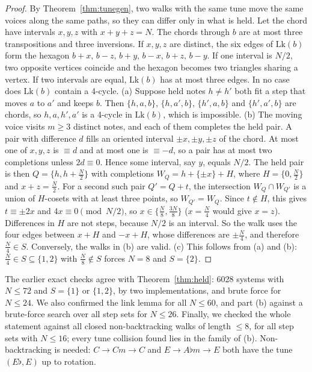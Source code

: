 \documentclass[11pt]{amsart}
\numberwithin{equation}{section}
\theoremstyle{plain}
\theoremstyle{definition}\newtheorem{definition}[theorem]{Definition}
\theoremstyle{remark}\newtheorem{remark}[theorem]{Remark}
\begin{document}
\begin{proof}
By Theorem~\ref{thm:tunegen}, two walks with the same tune move the same voices along the same paths, so they can differ only in what is held. Let the chord have intervals $x,y,z$ with $x+y+z=N$. The chords through $b$ are at most three transpositions and three inversions. If $x,y,z$ are distinct, the six edges of $\mathrm{Lk}(b)$ form the hexagon $b{+}x,\,b{-}z,\,b{+}y,\,b{-}x,\,b{+}z,\,b{-}y$. If one interval is $N/2$, two opposite vertices coincide and the hexagon becomes two triangles sharing a vertex. If two intervals are equal, $\mathrm{Lk}(b)$ has at most three edges. In no case does $\mathrm{Lk}(b)$ contain a 4-cycle.
(a) Suppose held notes $h\ne h'$ both fit a step that moves $a$ to $a'$ and keeps $b$. Then $\{h,a,b\}$, $\{h,a',b\}$, $\{h',a,b\}$ and $\{h',a',b\}$ are chords, so $h,a,h',a'$ is a 4-cycle in $\mathrm{Lk}(b)$, which is impossible.
(b) The moving voice visits $m\ge3$ distinct notes, and each of them completes the held pair. A pair with difference $d$ fills an oriented interval $\pm x,\pm y,\pm z$ of the chord. At most one of $x,y,z$ is $\equiv d$ and at most one is $\equiv-d$, so a pair has at most two completions unless $2d\equiv0$. Hence some interval, say $y$, equals $N/2$. The held pair is then $Q=\{h,h+\frac N2\}$ with completions $W_Q=h+\{\pm x\}+H$, where $H=\{0,\frac N2\}$ and $x+z=\frac N2$. For a second such pair $Q'=Q+t$, the intersection $W_Q\cap W_{Q'}$ is a union of $H$-cosets with at least three points, so $W_{Q'}=W_Q$. Since $t\notin H$, this gives $t\equiv\pm2x$ and $4x\equiv0\pmod{N/2}$, so $x\in\{\frac N8,\frac{3N}8\}$ ($x=\frac N4$ would give $x=z$). Differences in $H$ are not steps, because $N/2$ is an interval. So the walk uses the four edges between $x+H$ and $-x+H$, whose differences are $\pm\frac N4$, and therefore $\frac N4\in S$. Conversely, the walks in (b) are valid.
(c) This follows from (a) and (b): $\frac N4\in S\subseteq\{1,2\}$ with $\frac N8\notin S$ forces $N=8$ and $S=\{2\}$.
\end{proof}
The earlier exact checks agree with Theorem~\ref{thm:held}: 6028 systems with $N\le72$ and $S=\{1\}$ or $\{1,2\}$, by two implementations, and brute force for $N\le24$. We also confirmed the link lemma for all $N\le60$, and part (b) against a brute-force search over all step sets for $N\le26$. Finally, we checked the whole statement against all closed non-backtracking walks of length $\le8$, for all step sets with $N\le16$; every tune collision found lies in the family of (b). Non-backtracking is needed: $C\to Cm\to C$ and $E\to A\flat m\to E$ both have the tune $(E\flat,E)$ up to rotation.
\end{document}
